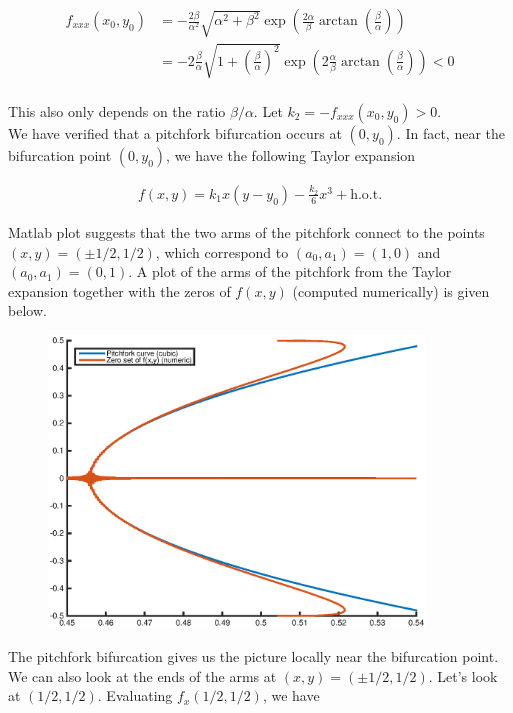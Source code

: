 \documentclass[12pt]{article}
\begin{document}
\begin{enumerate}
\begin{align*}
f_{xxx}(x_0, y_0)
&= -\frac{2 \beta}{\alpha^2}\sqrt{ \alpha^2 + \beta^2 }
\exp\left( \frac{2\alpha}{\beta} \arctan \left( \frac{\beta}{\alpha}\right) \right) \\
&= -2 \frac{\beta}{\alpha}\sqrt{ 1 + \left(\frac{\beta}{\alpha}\right)^2 }
\exp\left( 2 \frac{\alpha}{\beta} \arctan \left( \frac{\beta}{\alpha}\right) \right) < 0\\
\end{align*}

This also only depends on the ratio $\beta / \alpha$. Let $k_2 = -f_{xxx}(x_0, y_0) > 0$. \\

We have verified that a pitchfork bifurcation occurs at $(0, y_0)$. In fact, near the bifurcation point $(0, y_0)$, we have the following Taylor expansion

\begin{align*}
f(x, y) = k_1 x (y - y_0) - \frac{k_2}{6} x^3 + \text{h.o.t.}
\end{align*}

Matlab plot suggests that the two arms of the pitchfork connect to the points $(x,y) = (\pm 1/2, 1/2)$, which correspond to $(a_0, a_1) = (1, 0)$ and $(a_0, a_1) = (0, 1)$. A plot of the arms of the pitchfork from the Taylor expansion together with the zeros of $f(x,y)$ (computed numerically) is given below.

\begin{figure}[H]
\includegraphics[width=10cm]{pitchfork.eps}
\end{figure}

The pitchfork bifurcation gives us the picture locally near the bifurcation point. We can also look at the ends of the arms at $(x,y) = (\pm 1/2, 1/2)$. Let's look at $(1/2, 1/2)$. Evaluating $f_x(1/2, 1/2)$, we have


\end{enumerate}
\end{document}
